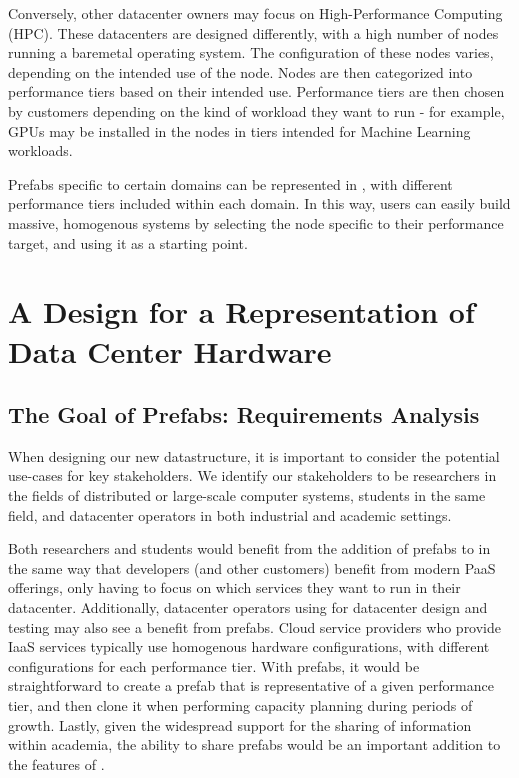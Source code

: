 \documentclass[11pt]{article}
\begin{document}
		Conversely, other datacenter owners may focus on High-Performance Computing (HPC).
		These datacenters are designed differently, with a high number of nodes running a baremetal operating system.
		The configuration of these nodes varies, depending on the intended use of the node.
		Nodes are then categorized into performance tiers based on their intended use.
		Performance tiers are then chosen by customers depending on the kind of workload they want to run - for example, GPUs may be installed in the nodes in tiers intended for Machine Learning workloads.

		Prefabs specific to certain domains can be represented in \opendc{}, with different performance tiers included within each domain.
		In this way, users can easily build massive, homogenous systems by selecting the node specific to their performance target, and using it as a starting point.

\newpage

\section{A Design for a Representation of Data Center Hardware} \label{sec:design}
	
	\subsection{The Goal of Prefabs: Requirements Analysis}
		When designing our new datastructure, it is important to consider the potential use-cases for key stakeholders.
		We identify our stakeholders to be researchers in the fields of distributed or large-scale computer systems, students in the same field, and datacenter operators in both industrial and academic settings.

		Both researchers and students would benefit from the addition of prefabs to \opendc{} in the same way that developers (and other customers) benefit from modern PaaS offerings, only having to focus on which services they want to run in their datacenter.
		Additionally, datacenter operators using \opendc{} for datacenter design and testing may also see a benefit from prefabs. 
		Cloud service providers who provide IaaS services typically use homogenous hardware configurations, with different configurations for each performance tier. 
		With prefabs, it would be straightforward to create a prefab that is representative of a given performance tier, and then clone it when performing capacity planning during periods of growth.
		Lastly, given the widespread support for the sharing of information within academia, the ability to share prefabs would be an important addition to the features of \opendc{}.
\end{document}
